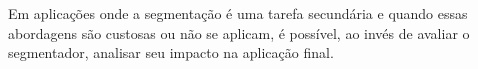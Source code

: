 Em aplicações onde a segmentação é uma tarefa secundária e quando essas abordagens são custosas ou não se aplicam, é possível, ao invés de avaliar o segmentador, analisar seu impacto na aplicação final.


















